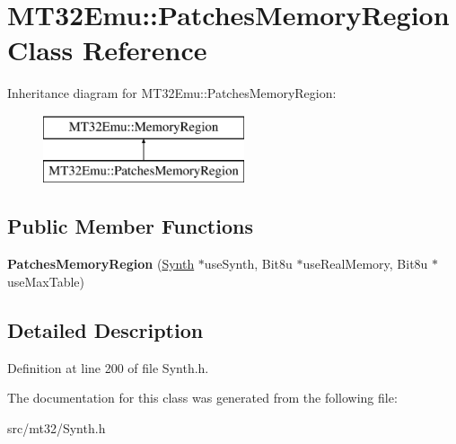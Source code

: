 \hypertarget{classMT32Emu_1_1PatchesMemoryRegion}{\section{M\-T32\-Emu\-:\-:Patches\-Memory\-Region Class Reference}
\label{classMT32Emu_1_1PatchesMemoryRegion}
}
Inheritance diagram for M\-T32\-Emu\-:\-:Patches\-Memory\-Region\-:\begin{figure}[H]
\begin{center}
\leavevmode
\includegraphics[height=2.000000cm]{classMT32Emu_1_1PatchesMemoryRegion}
\end{center}
\end{figure}
\subsection*{Public Member Functions}
\begin{DoxyCompactItemize}
\item 
\hypertarget{classMT32Emu_1_1PatchesMemoryRegion_a804b7edf3f1e2a7ed9b7e42a41e9714b}{{\bfseries Patches\-Memory\-Region} (\hyperlink{classMT32Emu_1_1Synth}{Synth} $\ast$use\-Synth, Bit8u $\ast$use\-Real\-Memory, Bit8u $\ast$use\-Max\-Table)}\label{classMT32Emu_1_1PatchesMemoryRegion_a804b7edf3f1e2a7ed9b7e42a41e9714b}

\end{DoxyCompactItemize}


\subsection{Detailed Description}


Definition at line 200 of file Synth.\-h.



The documentation for this class was generated from the following file\-:\begin{DoxyCompactItemize}
\item 
src/mt32/Synth.\-h\end{DoxyCompactItemize}

